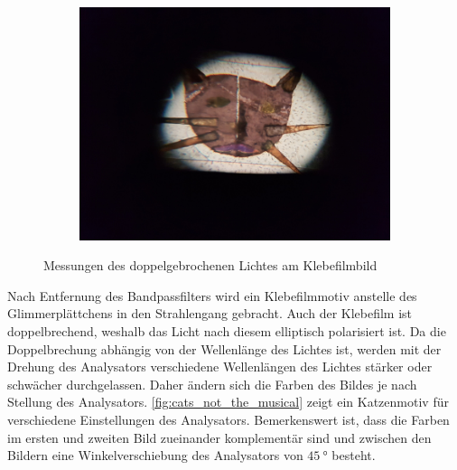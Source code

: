 \begin{figure}[tb]
\begin{subfigure}{.3\textwidth}
		\label{subfig:catb}
	\end{subfigure}
	$\quad$
	\begin{subfigure}{.3\textwidth}
		\centering
		\includegraphics[height=.8\linewidth]{./img/cat3.jpg}
		\label{subfig:catc}
	\end{subfigure}
	\caption[Doppelbrechung von polychromatischem Licht]{Messungen des doppelgebrochenen Lichtes am Klebefilmbild}
	\label{fig:cats_not_the_musical}
\end{figure}
Nach Entfernung des Bandpassfilters wird ein Klebefilmmotiv anstelle des Glimmerplättchens in den Strahlengang gebracht.
Auch der Klebefilm ist doppelbrechend, weshalb das Licht nach diesem elliptisch polarisiert ist.
Da die Doppelbrechung abhängig von der Wellenlänge des Lichtes ist, werden mit der Drehung des Analysators verschiedene Wellenlängen des Lichtes stärker oder schwächer durchgelassen.
Daher ändern sich die Farben des Bildes je nach Stellung des Analysators.
\autoref{fig:cats_not_the_musical} zeigt ein Katzenmotiv für verschiedene Einstellungen des Analysators.
Bemerkenswert ist, dass die Farben im ersten und zweiten Bild zueinander komplementär sind und zwischen den Bildern eine Winkelverschiebung des Analysators von $\SI{45}{\degree}$ besteht.
